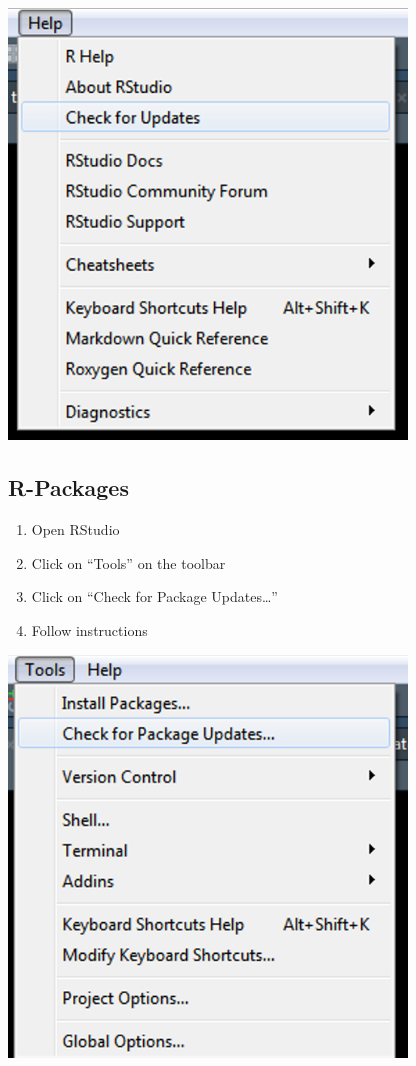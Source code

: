 \documentclass[
  letterpaper,
  DIV=11,
  numbers=noendperiod]{scrreprt}
\begin{document}
\includegraphics[width=4.16667in,height=\textheight]{images/installation_updates/update_rstudio.png}

\hypertarget{r-packages-1}{%
\subsection{R-Packages}\label{r-packages-1}}

\begin{enumerate}
\def\labelenumi{\arabic{enumi}.}
\item
  Open RStudio
\item
  Click on ``Tools'' on the toolbar
\item
  Click on ``Check for Package Updates\ldots{}''
\item
  Follow instructions
\end{enumerate}

\includegraphics[width=4.16667in,height=\textheight]{images/installation_updates/update_packages.png}
\end{document}
